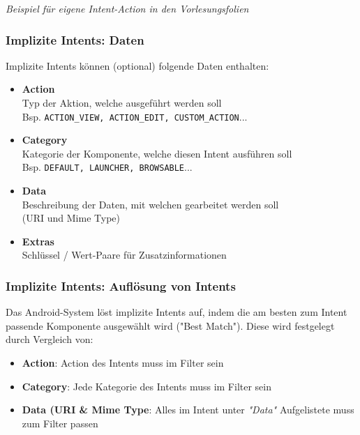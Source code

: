\documentclass[a4paper]{article}
\begin{document}
	\textit{Beispiel für eigene Intent-Action in den Vorlesungsfolien}

	\subsubsection{Implizite Intents: Daten}
	
	Implizite Intents können (optional) folgende Daten enthalten:
	
	\begin{itemize}
		
		\item \textbf{Action}\\
				Typ der Aktion, welche ausgeführt werden soll\\
				Bsp. \texttt{ACTION\_VIEW, ACTION\_EDIT, CUSTOM\_ACTION}...
				
		\item \textbf{Category}\\
		Kategorie der Komponente, welche diesen Intent ausführen soll\\
		Bsp. \texttt{DEFAULT, LAUNCHER, BROWSABLE}...
		
		\item \textbf{Data}\\
		Beschreibung der Daten, mit welchen gearbeitet werden soll\\
		(URI und Mime Type)
		
		\item \textbf{Extras}\\
		Schlüssel / Wert-Paare für Zusatzinformationen
		
	\end{itemize}
	
	\newpage
	
	\subsubsection{Implizite Intents: Auflösung von Intents}
	
	Das Android-System löst implizite Intents auf, indem die am besten zum Intent passende Komponente ausgewählt wird ("Best Match"). Diese wird festgelegt durch Vergleich von:
		
	\begin{itemize}
		
		\item \textbf{Action}: Action des Intents muss im Filter sein
		
		\item \textbf{Category}: Jede Kategorie des Intents muss im Filter sein
		
		\item \textbf{Data (URI \& Mime Type}: Alles im Intent unter \textit{"Data"} Aufgelistete muss zum Filter passen
		
	\end{itemize}
	
\end{document}
